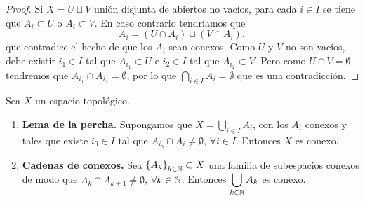 \begin{proof}
Si $\displaystyle X = U \sqcup V $ unión disjunta de abiertos no vacíos, para cada $\displaystyle i \in I $ se tiene que $\displaystyle A_{i}\subset U $ o $\displaystyle A_{i}\subset V $. En caso contrario tendríamos que 
\[A_{i}=\left(U\cap A_{i}\right)\sqcup\left(V\cap A_{i}\right) ,\]
que contradice el hecho de que los $\displaystyle A_{i} $ sean conexos. Como $\displaystyle U $ y $\displaystyle V $ no son vacíos, debe existir $\displaystyle i_{1}\in I $ tal que $\displaystyle A_{i_{1}}\subset U $ e $\displaystyle i_{2}\in I $ tal que $\displaystyle A_{i_{2}}\subset V $. Pero como $\displaystyle U \cap V = \emptyset $ tendremos que $\displaystyle A_{i_{1}}\cap A_{i_{2}}= \emptyset $, por lo que $\displaystyle \bigcap_{ i \in I}A_{i}= \emptyset $ que es una contradicción.
\end{proof}
\begin{theorem}
Sea $\displaystyle X $ un espacio topológico. 
\begin{enumerate}
\item \textbf{Lema de la percha.} Supongamos que $\displaystyle X = \bigcup_{i \in I}A_{i} $, con los $\displaystyle A_{i} $ conexos y tales que existe $\displaystyle i_{0}\in I $ tal que $\displaystyle A_{i_{0}}\cap A_{i}\neq \emptyset $, $\displaystyle \forall i \in I $. Entonces $\displaystyle X $ es conexo.
\item \textbf{Cadenas de conexos.} Sea $\displaystyle \left\{ A_{k}\right\} _{k \in \mathbb{N}}\subset X $ una familia de subespacios conexos de modo que $\displaystyle A _{k}\cap A_{k+1}\neq \emptyset $, $\displaystyle \forall k \in \mathbb{N} $. Entonces $\displaystyle \bigcup_{k \in \mathbb{N}}A_{k} $ es conexo.
\end{enumerate}
\end{theorem}
